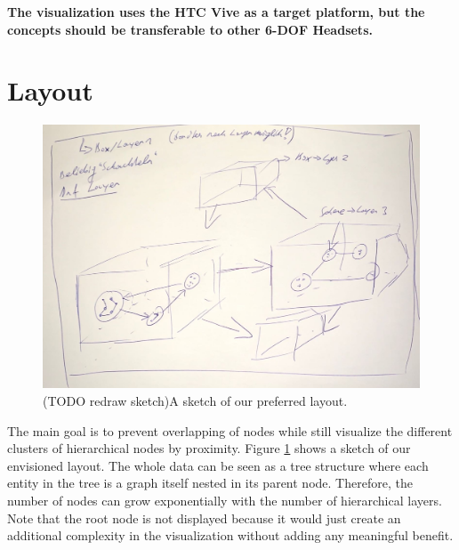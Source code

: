 \textbf{The visualization uses the HTC Vive as a target platform, but the concepts should be transferable to other 6-DOF Headsets.}


\section{Layout}
\label{chap:ps-layout}

\begin{figure}[h]
    \centering
    \includegraphics[width=1\textwidth]{chapters/graphics/concept1.jpg}
    \caption{(TODO redraw sketch)A sketch of our preferred layout. } 
    \label{fig:layoutSketch} 
\end{figure}

The main goal is to prevent overlapping of nodes while still visualize the different clusters of hierarchical nodes by proximity. Figure \ref{fig:layoutSketch} shows a sketch of our envisioned layout. The whole data can be seen as a tree structure where each entity in the tree is a graph itself nested in its parent node. Therefore, the number of nodes can grow exponentially with the number of hierarchical layers. Note that the root node is not displayed because it would just create an additional complexity in the visualization without adding any meaningful benefit.

